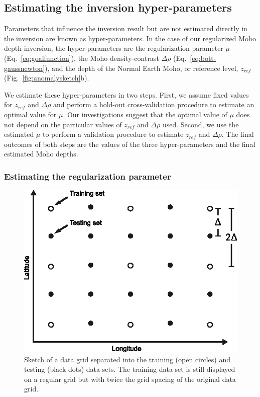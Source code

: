 \documentclass[extra,mreferee]{gji}
\begin{document}
\subsection{Estimating the inversion hyper-parameters}

Parameters that influence the inversion result but are not estimated directly
in the inversion are known as hyper-parameters.
In the case of our regularized Moho depth inversion, the hyper-parameters are
the regularization parameter $\mu$ (Eq.~\ref{eq:goalfunction}),
the Moho density-contrast $\Delta \rho$ (Eq.~\ref{eq:bott-gaussnewton}),
and the depth of the Normal Earth Moho, or reference level, $z_{ref}$
(Fig.~\ref{fig:anomalysketch}b).

We estimate these hyper-parameters in two steps.
First, we assume fixed values for
$z_{ref}$ and $\Delta\rho$ and perform a hold-out cross-validation procedure
\citep{hansen1992} to estimate an optimal value for $\mu$.
Our investigations suggest that the optimal value of $\mu$ does not depend on
the particular values of $z_{ref}$ and $\Delta\rho$ used.
Second, we use the estimated $\mu$ to perform a validation
procedure to estimate $z_{ref}$ and $\Delta\rho$.
The final outcomes of both steps are the values of the three hyper-parameters
and the final estimated Moho depths.



\subsubsection{Estimating the regularization parameter}

\begin{figure}
    \centering
    \includegraphics[width=0.5\columnwidth]{figures/cv-grid-separation}
    \caption{Sketch of a data grid separated into
        the training (open circles)
        and testing (black dots) data sets.
        The training data set is still displayed on a regular grid
        but with twice the grid spacing
        of the original data grid.}
    \label{fig:grid_separation}
\end{figure}
\end{document}
